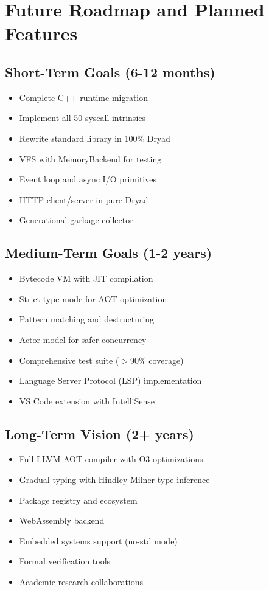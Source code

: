 \documentclass[12pt,a4paper]{article}
\theoremstyle{definition}
\begin{document}
\newpage

\section{Future Roadmap and Planned Features}

\subsection{Short-Term Goals (6-12 months)}

\begin{itemize}[leftmargin=*]
    \item Complete C++ runtime migration
    \item Implement all 50 syscall intrinsics
    \item Rewrite standard library in 100\% Dryad
    \item VFS with MemoryBackend for testing
    \item Event loop and async I/O primitives
    \item HTTP client/server in pure Dryad
    \item Generational garbage collector
\end{itemize}

\subsection{Medium-Term Goals (1-2 years)}

\begin{itemize}[leftmargin=*]
    \item Bytecode VM with JIT compilation
    \item Strict type mode for AOT optimization
    \item Pattern matching and destructuring
    \item Actor model for safer concurrency
    \item Comprehensive test suite ($>$90\% coverage)
    \item Language Server Protocol (LSP) implementation
    \item VS Code extension with IntelliSense
\end{itemize}

\subsection{Long-Term Vision (2+ years)}

\begin{itemize}[leftmargin=*]
    \item Full LLVM AOT compiler with O3 optimizations
    \item Gradual typing with Hindley-Milner type inference
    \item Package registry and ecosystem
    \item WebAssembly backend
    \item Embedded systems support (no-std mode)
    \item Formal verification tools
    \item Academic research collaborations
\end{itemize}
\end{document}
